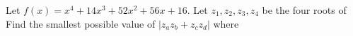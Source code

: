 Let $f(x) =x^4+14x^3+52x^2+56x+16.$  Let $z_1, z_2, z_3, z_4$ be the four roots of   Find the smallest possible value of $|z_az_b+z_cz_d|$ where 
